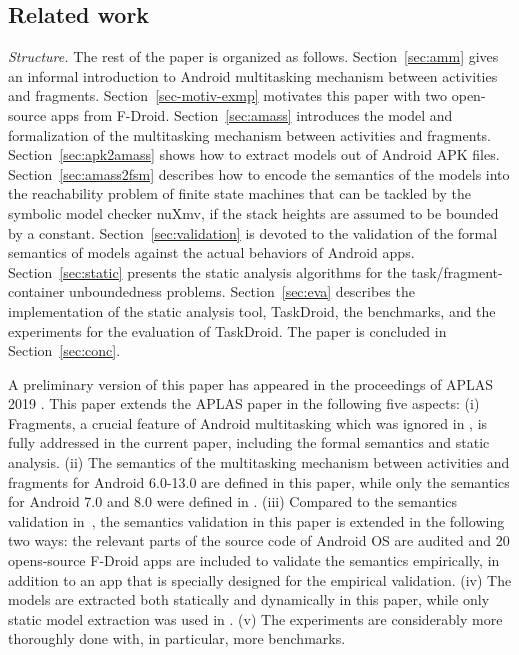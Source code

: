 
\subsection{Related work}\label{sec:related}

\medskip
 
\noindent\emph{Structure.} The rest of the paper is organized as follows. 
Section~\ref{sec:amm} gives an informal introduction to Android multitasking mechanism between activities and fragments. 
Section~\ref{sec-motiv-exmp} motivates this paper with two open-source apps from F-Droid. 
Section~\ref{sec:amass} introduces the {\AMASS} model and formalization of the multitasking mechanism  between activities and fragments. Section~\ref{sec:apk2amass} shows how to extract {\AMASS} models out of Android APK files. Section~\ref{sec:amass2fsm} describes how to encode the semantics of the {\AMASS} models into the reachability problem of finite state machines  that can be tackled by the symbolic model checker nuXmv, if the stack heights are assumed to be bounded by a constant. Section~\ref{sec:validation} is devoted to the validation of the formal semantics of {\AMASS} models against the actual behaviors of Android apps. 
Section~\ref{sec:static} presents the static analysis algorithms for the task/fragment-container unboundedness problems. 
Section~\ref{sec:eva} describes the implementation of the static analysis tool, TaskDroid, the benchmarks, and the experiments for the evaluation of TaskDroid. %
The paper is concluded in Section~\ref{sec:conc}. 

\medskip

A preliminary version of this paper has appeared in the proceedings of APLAS 2019 \cite{HCWWY19}. This paper extends the APLAS paper in the following five aspects: (i) Fragments, a crucial feature of Android multitasking which was ignored in \cite{HCWWY19}, is fully addressed in the current paper, including the formal semantics and static analysis. (ii) The semantics of the multitasking mechanism between activities and fragments for Android 6.0-13.0 are defined in this paper, while only the semantics for Android 7.0 and 8.0 were defined in \cite{HCWWY19}. (iii) Compared to the semantics validation in~\cite{HCWWY19}, the semantics validation in this paper is extended in the following two ways: the relevant parts of the source code of Android OS are audited and 20 opens-source F-Droid apps are included to validate the semantics empirically, in addition to an app that is specially designed for the empirical validation. (iv) The models are extracted both statically and dynamically in this paper, while only static model extraction was used in \cite{HCWWY19}. (v) The experiments are considerably more thoroughly done with, in particular, more benchmarks.
 
